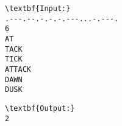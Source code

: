 \begin{verbatim}
\textbf{Input:}
.---.--.-.-.-.---...-.---.
6
AT
TACK
TICK
ATTACK
DAWN
DUSK \end{verbatim}
\begin{verbatim}
\textbf{Output:}
2
\end{verbatim}
